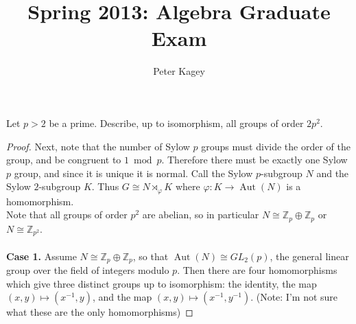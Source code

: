 \documentclass{article}
\newenvironment{problem}[2][Problem]{\begin{trivlist}
\item[\hskip \labelsep {\bfseries #1}\hskip \labelsep {\bfseries #2.}]}{\end{trivlist}}
\newcommand{\Z}{\mathbb Z}
\newcommand{\Aut}{\operatorname{Aut}}
\newcommand{\fn}[3]{{#1 \colon #2 \rightarrow #3}}
\begin{document}
\title{Spring 2013: Algebra Graduate Exam}
\author{Peter Kagey}

\maketitle

\begin{problem}{1}
  Let $p > 2$ be a prime. Describe, up to isomorphism, all groups of order $2p^2$.
\end{problem}

\begin{proof}
  Next, note that the number of Sylow $p$ groups must divide the order of the
  group, and be congruent to $1 \bmod p$. Therefore there must be exactly one
  Sylow $p$ group, and since it is unique it is normal. Call the Sylow
  $p$-subgroup $N$ and the Sylow $2$-subgroup $K$.
  Thus $G \cong N \rtimes_\varphi K$ where $\fn \varphi K {\Aut(N)}$ is a homomorphism.
  \\
  Note that all groups of order $p^2$ are abelian, so in particular
  $N \cong \Z_p \oplus \Z_p$ or $N \cong \Z_{p^2}$.
  \\~\\
  \textbf{Case 1.} Assume $N \cong \Z_p \oplus \Z_p$, so that
  $\Aut(N) \cong GL_2(p)$, the general linear group over the field of integers
  modulo $p$. Then there are four homomorphisms which give three distinct groups
  up to isomorphism: the identity, the map $(x, y) \mapsto (x^{-1}, y)$,
  and the map $(x, y) \mapsto (x^{-1}, y^{-1})$.
  (Note: I'm not sure what these are the only homomorphisms)
\end{proof}
\end{document}
